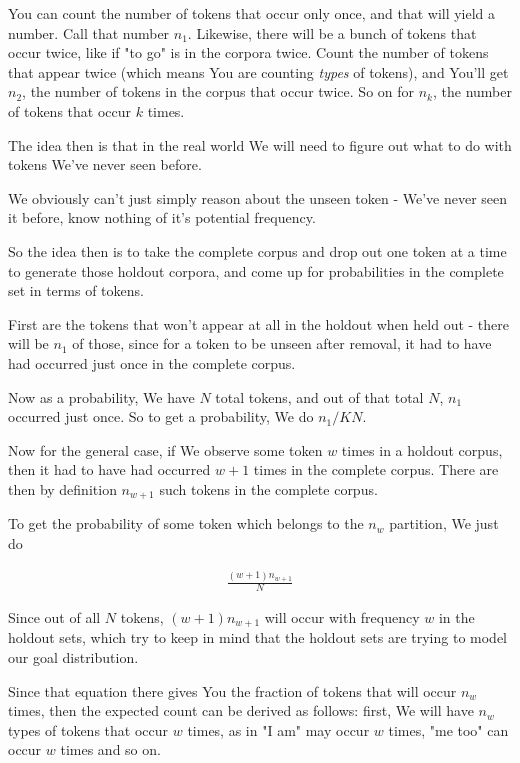 \documentclass{article}
\begin{document}
			You can count the number of tokens that occur only once, and that will yield a number. Call that number $n_1$. Likewise, there will be a bunch of tokens that occur twice, like if "to go" is in the corpora twice. Count the number of tokens that appear twice (which means You are counting \textit{types} of tokens), and You'll get $n_2$, the number of tokens in the corpus that occur twice. So on for $n_k$, the number of tokens that occur $k$ times.
			
			The idea then is that in the real world We will need to figure out what to do with tokens We've never seen before.
			
			We obviously can't just simply reason about the unseen token - We've never seen it before, know nothing of it's potential frequency.
			
			So the idea then is to take the complete corpus and drop out one token at a time to generate those holdout corpora, and come up for probabilities in the complete set in terms of tokens.
			
			First are the tokens that won't appear at all in the holdout when held out - there will be $n_1$ of those, since for a token to be unseen after removal, it had to have had occurred just once in the complete corpus.
			
			Now as a probability, We have $N$ total tokens, and out of that total $N$, $n_1$ occurred just once. So to get a probability, We do $n_1/KN$.
			
			Now for the general case, if We observe some token $w$ times in a holdout corpus, then it had to have had occurred $w+1$ times in the complete corpus. There are then by definition $n_{w+1}$ such tokens in the complete corpus. 
			
			To get the probability of some token which belongs to the $n_w$ partition, We just do 
			
			\begin{align}
				\frac{(w+1)n_{w+1}}{N}
			\end{align}
			
			Since out of all $N$ tokens, $(w+1)n_{w+1}$ will occur with frequency $w$ in the holdout sets, which try to keep in mind that the holdout sets are trying to model our goal distribution.
			
			Since that equation there gives You the fraction of tokens that will occur $n_w$ times, then the expected count can be derived as follows: first, We will have $n_w$ types of tokens that occur $w$ times, as in "I am" may occur $w$ times, "me too" can occur $w$ times and so on.
			
\end{document}
